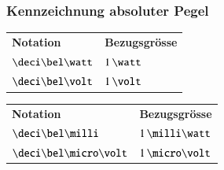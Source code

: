 \subsubsection{Kennzeichnung absoluter Pegel}

\begin{center}
    \begin{tabular}{ll}
        \textbf{Notation}       & \textbf{Bezugsgrösse} \\
        $\deci\bel\watt$        & $1 \, \watt$          \\
        $\deci\bel\volt$        & $1 \, \volt$          \\
    \end{tabular}\hspace{5mm}
    \begin{tabular}{ll}
        \textbf{Notation}       & \textbf{Bezugsgrösse} \\
        $\deci\bel\milli$       & $1 \, \milli \watt$ \\
        $\deci\bel\micro\volt$  & $1 \, \micro \volt$ 
    \end{tabular}
\end{center}

